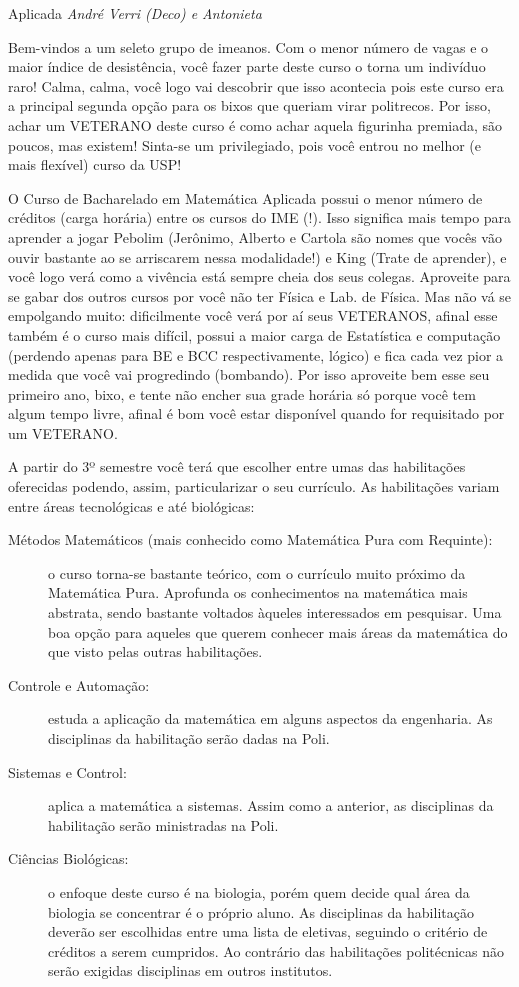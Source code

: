 \begin{subsecao}{Aplicada}
{\em André Verri (Deco) e Antonieta}

Bem-vindos a um seleto grupo de imeanos. Com o menor número de vagas e o
maior índice de desistência, você fazer parte deste curso o torna um indivíduo
raro! Calma, calma, você logo vai descobrir que isso acontecia pois este curso
era a principal segunda opção para os bixos que queriam virar politrecos. Por
isso, achar um VETERANO deste curso é como achar aquela figurinha premiada, são
poucos, mas existem! Sinta-se um privilegiado, pois você entrou no melhor (e
mais flexível) curso da USP!

O Curso de Bacharelado em Matemática Aplicada possui o menor número de
créditos (carga horária) entre os cursos do IME (!). Isso significa mais tempo
para aprender a jogar Pebolim (Jerônimo, Alberto e Cartola são nomes que vocês
vão ouvir bastante ao se arriscarem nessa modalidade!) e King (Trate de
aprender), e você logo verá como a vivência está sempre cheia dos seus colegas.
Aproveite para se gabar dos outros cursos por você não ter Física e Lab. de
Física. Mas não vá se empolgando muito: dificilmente você verá por aí seus
VETERANOS, afinal esse também é o curso mais difícil, possui a maior carga de
Estatística e computação (perdendo apenas para BE e BCC respectivamente,
lógico) e fica cada vez pior a medida que você vai progredindo (bombando). Por
isso aproveite bem esse seu primeiro ano, bixo, e tente não encher sua grade
horária só porque você tem algum tempo livre, afinal é bom você estar
disponível quando for requisitado por um VETERANO.

A partir do 3º semestre você terá que escolher entre umas das habilitações
oferecidas podendo, assim, particularizar o seu currículo. As habilitações
variam entre áreas tecnológicas e até biológicas:
\begin{description}

\item [Métodos Matemáticos (mais conhecido como Matemática Pura com Requinte):]
o curso torna-se bastante teórico, com o currículo muito próximo da Matemática
Pura. Aprofunda os conhecimentos na matemática mais abstrata, sendo bastante
voltados àqueles interessados em pesquisar. Uma boa opção para aqueles que
querem conhecer mais áreas da matemática do que visto pelas outras habilitações.
\item [Controle e Automação:] estuda a aplicação da matemática em alguns
aspectos da engenharia. As disciplinas da habilitação serão dadas na Poli.
\item  [Sistemas e Control:] aplica a matemática a sistemas. Assim como a
anterior, as disciplinas da habilitação serão ministradas na Poli.
\item  [Ciências Biológicas:] o enfoque deste curso é na biologia, porém quem
decide qual área da biologia se concentrar é o próprio aluno. As disciplinas da
habilitação deverão ser escolhidas entre uma lista de eletivas, seguindo o
critério de créditos a serem cumpridos. Ao contrário das habilitações
politécnicas não serão exigidas disciplinas em outros institutos.
\end{description}


\end{subsecao}
